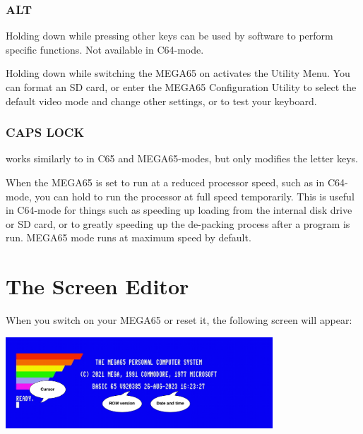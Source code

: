 \subsubsection{ALT}
Holding  down while pressing other keys can be used by software to perform specific functions. Not available in C64-mode.

Holding  down while switching the MEGA65 on activates the Utility Menu. You can format an SD card, or enter the MEGA65 Configuration Utility to select the default video mode and change other settings, or to test your keyboard.

\subsubsection{CAPS LOCK}
 works similarly to  in C65 and MEGA65-modes, but only modifies the letter keys.

When the MEGA65 is set to run at a reduced processor speed, such as in C64-mode, you can hold  to run the processor at full speed temporarily. This is useful in C64-mode for things such as
speeding up loading from the internal disk drive or SD card, or to greatly speeding up the de-packing process after a program is run. MEGA65 mode runs at maximum speed by default.



\section{The Screen Editor}
\label{sec:screen-editor}

When you switch on your MEGA65 or reset it, the following screen will appear:

\begin{center}
\includegraphics[width={10cm}]{images/introduction-screen/layout.png}
\end{center}

